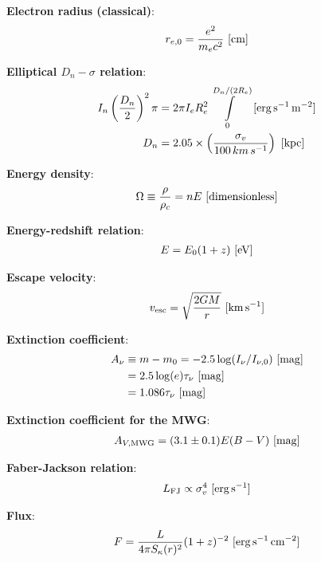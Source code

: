 \documentclass[a4paper,11pt]{article}
\begin{document}
{\noindent}\textbf{Electron radius (classical)}:
\begin{align*}
    r_{e,0} = \frac{e^2}{m_ec^2} ~ [{\rm cm}]
\end{align*}

{\noindent}\textbf{Elliptical $D_n-\sigma$ relation}:
\begin{align*}
    I_n\left(\frac{D_n}{2}\right)^2\pi &= 2\pi I_eR_e^2 \int\limits_0^{D_n/(2R_e)} ~ [{\rm erg\,s^{-1}\,m^{-2}}] \\
    D_n &= 2.05\times\left(\frac{\sigma_v}{100\,km\,s^{-1}}\right) ~ [{\rm kpc}]
\end{align*}

{\noindent}\textbf{Energy density}:
\begin{align*}
    \Omega \equiv \dfrac{\rho}{\rho_c} = nE ~ [{\rm dimensionless}]
\end{align*}

{\noindent}\textbf{Energy-redshift relation}:
\begin{align*}
    E = E_0(1+z) ~ [{\rm eV}]
\end{align*}

{\noindent}\textbf{Escape velocity}:
\begin{align*}
    v_\mathrm{esc} = \sqrt{\frac{2GM}{r}} ~ [{\rm km\,s^{-1}}]
\end{align*}

{\noindent}\textbf{Extinction coefficient}:
\begin{align*}
    A_\nu &\equiv m-m_0 = -2.5\log(I_\nu/I_{\nu,0}) ~ [{\rm mag}] \\
          &= 2.5\log(e)\tau_\nu ~ [{\rm mag}] \\
          &= 1.086\tau_\nu ~ [{\rm mag}]
\end{align*}

{\noindent}\textbf{Extinction coefficient for the MWG}:
\begin{align*}
    A_{V,\mathrm{MWG}} = (3.1\pm0.1)E(B-V) ~ [{\rm mag}]
\end{align*}

{\noindent}\textbf{Faber-Jackson relation}:
\begin{align*}
    L_\mathrm{FJ} \propto \sigma_v^4 ~ [{\rm erg\,s^{-1}}]
\end{align*}

{\noindent}\textbf{Flux}:
\begin{align*}
    F = \frac{L}{4\pi S_\kappa(r)^2}(1+z)^{-2} ~ [{\rm erg\,s^{-1}\,cm^{-2}}]
\end{align*}
\end{document}
